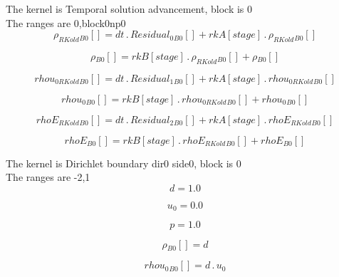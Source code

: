 \documentclass{article}
\begin{document}
\noindent The kernel is Temporal solution advancement, block is 0\\\noindent The ranges are 0,block0np0\\\begin{dmath}{\rho_{RKold}{_{B0}}}[{}] = dt \,.\, {Residual_{0}{_{B0}}}[{}] + {rkA}[{stage}] \,.\, {\rho_{RKold}{_{B0}}}[{}]\end{dmath}

\begin{dmath}{\rho{_{B0}}}[{}] = {rkB}[{stage}] \,.\, {\rho_{RKold}{_{B0}}}[{}] + {\rho{_{B0}}}[{}]\end{dmath}

\begin{dmath}{rhou_{0 RKold}{_{B0}}}[{}] = dt \,.\, {Residual_{1}{_{B0}}}[{}] + {rkA}[{stage}] \,.\, {rhou_{0 RKold}{_{B0}}}[{}]\end{dmath}

\begin{dmath}{rhou_{0}{_{B0}}}[{}] = {rkB}[{stage}] \,.\, {rhou_{0 RKold}{_{B0}}}[{}] + {rhou_{0}{_{B0}}}[{}]\end{dmath}

\begin{dmath}{rhoE_{RKold}{_{B0}}}[{}] = dt \,.\, {Residual_{2}{_{B0}}}[{}] + {rkA}[{stage}] \,.\, {rhoE_{RKold}{_{B0}}}[{}]\end{dmath}

\begin{dmath}{rhoE{_{B0}}}[{}] = {rkB}[{stage}] \,.\, {rhoE_{RKold}{_{B0}}}[{}] + {rhoE{_{B0}}}[{}]\end{dmath}

\noindent The kernel is Dirichlet boundary dir0 side0, block is 0\\\noindent The ranges are -2,1\\\begin{dmath}d = 1.0\end{dmath}

\begin{dmath}u_{0} = 0.0\end{dmath}

\begin{dmath}p = 1.0\end{dmath}

\begin{dmath}{\rho{_{B0}}}[{}] = d\end{dmath}

\begin{dmath}{rhou_{0}{_{B0}}}[{}] = d \,.\, u_{0}\end{dmath}
\end{document}
